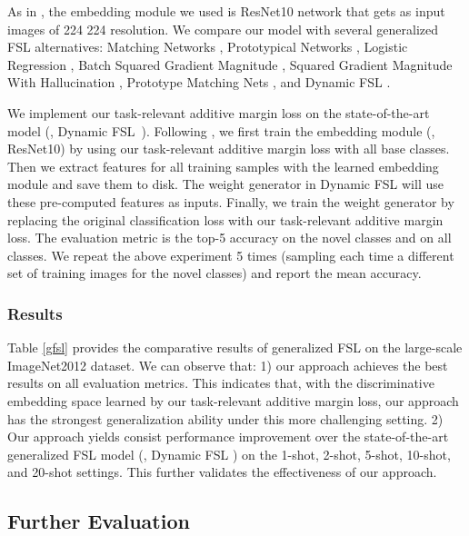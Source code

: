 \documentclass[10pt,twocolumn,letterpaper]{article}
\begin{document}
As in \cite{Gidaris2018cvpr}, the embedding module we used is ResNet10 network that gets as input images of 224  224 resolution. We compare our model with several generalized FSL alternatives: Matching Networks \cite{vinyals2016bnips}, Prototypical Networks \cite{Snell2017nips}, Logistic Regression \cite{Wang2018cvprlsl}, Batch Squared Gradient Magnitude \cite{Hariharan2017iccv}, Squared Gradient Magnitude With Hallucination \cite{Hariharan2017iccv}, Prototype Matching Nets \cite{Wang2018cvprlsl}, and Dynamic FSL \cite{Gidaris2018cvpr}. 

We implement our task-relevant additive margin loss on the state-of-the-art model (\ie, Dynamic FSL~\cite{Gidaris2018cvpr}). Following \cite{Wang2018cvprlsl}, we first train the embedding module (\ie, ResNet10) by using our task-relevant additive margin loss with all base classes. Then we extract features for all training samples with the learned embedding module and save them to disk. The weight generator in Dynamic FSL \cite{Gidaris2018cvpr} will use these pre-computed features as inputs. Finally, we train the weight generator by replacing the original classification loss with our task-relevant additive margin loss. The evaluation metric is the top-5 accuracy on the novel classes and on all classes. We repeat the above experiment 5 times (sampling each time a different set of training images for the novel classes) and report the mean accuracy.

\subsubsection{Results}

Table \ref{gfsl} provides the comparative results of generalized FSL on the large-scale ImageNet2012 dataset. We can observe that: 1) our approach achieves the best results on all evaluation metrics. This indicates that, with the discriminative embedding space learned by our task-relevant additive margin loss, our approach has the strongest generalization ability under this more challenging setting. 2) Our approach yields consist performance improvement over the state-of-the-art generalized FSL model (\ie, Dynamic FSL \cite{Gidaris2018cvpr}) on the 1-shot, 2-shot, 5-shot, 10-shot, and 20-shot settings. This further validates the effectiveness of our approach. 

\subsection{Further Evaluation}
\end{document}
